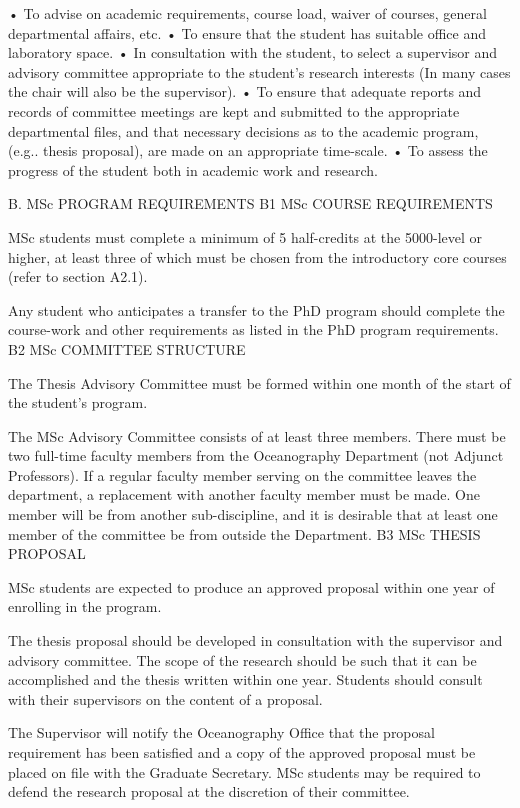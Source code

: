 •	To advise on academic requirements, course load, waiver of courses, general departmental affairs, etc.
•	To ensure that the student has suitable office and laboratory space.
•	In consultation with the student, to select a supervisor and advisory committee appropriate to the student's research interests (In many cases the chair will also be the supervisor).
•	To ensure that adequate reports and records of committee meetings are kept and submitted to the appropriate departmental files, and that necessary decisions as to the academic program, (e.g.. thesis proposal), are made on an appropriate time-scale.
•	To assess the progress of the student both in academic work and research.
 

B.	MSc  PROGRAM REQUIREMENTS
B1	MSc COURSE REQUIREMENTS

MSc students must complete a minimum of 5 half-credits at the 5000-level or higher, at least three of which must be chosen from the introductory core courses (refer to section A2.1).

Any student who anticipates a transfer to the PhD program should complete the course-work and other requirements as listed in the PhD program requirements.
B2	MSc COMMITTEE STRUCTURE

The Thesis Advisory Committee must be formed within one month of the start of the student’s program.

The MSc Advisory Committee consists of at least three members. There must be two full-time faculty members from the Oceanography Department (not Adjunct Professors). If a regular faculty member serving on the committee leaves the department, a replacement with another faculty member must be made. One member will be from another sub-discipline, and it is desirable that at least one member of the committee be from outside the Department.
B3	MSc THESIS PROPOSAL

MSc students are expected to produce an approved proposal within one year of enrolling in the program.

The thesis proposal should be developed in consultation with the supervisor and advisory committee. The scope of the research should be such that it can be accomplished and the thesis written within one year. Students should consult with their supervisors on the content of a proposal.

The Supervisor will notify the Oceanography Office that the proposal requirement has been satisfied and a copy of the approved proposal must be placed on file with the Graduate Secretary. MSc students may be required to defend the research proposal at the discretion of their committee.

